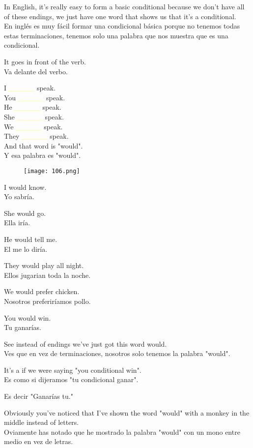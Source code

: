 In English, it's really easy to form a basic conditional because we don't
have all of these endings, we just have one word that shows us that it's a
conditional.\\
En inglés es muy fácil formar una condicional básica porque no tenemos
todas estas terminaciones, tenemos solo una palabra que nos muestra que es
una condicional.

It goes in front of the verb.\\
Va delante del verbo.

I \textcolor{yellow}{\_\_\_\_\_} speak.\\
You \textcolor{yellow}{\_\_\_\_\_} speak.\\
He \textcolor{yellow}{\_\_\_\_\_} speak.\\
She \textcolor{yellow}{\_\_\_\_\_} speak.\\
We \textcolor{yellow}{\_\_\_\_\_} speak.\\
They \textcolor{yellow}{\_\_\_\_\_} speak.\\

And that word is "would".\\
Y esa palabra es "would".

\begin{figure}[H]
\centering
\texttt{[image: 106.png]}
\end{figure}

I would know.\\
Yo sabría.

She would go.\\
Ella iría.

He would tell me.\\
El me lo diría.

They would play all night.\\
Ellos jugarian toda la noche.

We would prefer chicken.\\
Nosotros preferiríamos pollo.

You would win.\\
Tu ganarías.

See instead of endings we've just got this word would.\\
Ves que en vez de terminaciones, nosotros solo tenemos la palabra "would".

It's a if we were saying "you conditional win".\\
Es como si dijeramos "tu condicional ganar".

Es decir "Ganarías tu."

Obviously you've noticed that I've shown the word "would" with a monkey in
the middle instead of letters.\\
Oviamente has notado que he mostrado la palabra "would" con un mono entre
medio en vez de letras.

